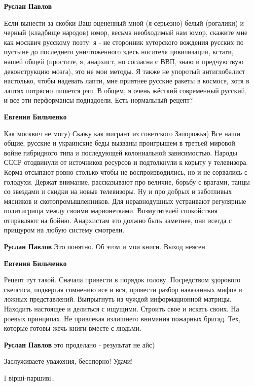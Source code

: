 \begin{itemize}
\begin{itemize} %
\textbf{Руслан Павлов} 

Если вынести за скобки Ваш оцененный мной (я серьезно) белый (рогалики) и
черный (кладбище народов) юмор, весьма необходимый нам юмор, скажите мне как
москвич русскому поэту: я - не сторонник хуторского вождения русских по пустыне
до последнего уничтоженного здесь носителя цивилизации, кстати, нашей общей
(простите, я, анархист, но согласна с ВВП, знаю и предчувствую деконструкцию
мозга), это не мои методы. Я также не упоротый антиглобалист настолько, чтобы
надевать лапти, мне приятнее русские ракеты в космосе, хотя в лаптях потрясно
пишется рэп. В общем, я очень жёсткий современный русский, и все эти
перформансы поднадоели. Есть нормальный рецепт?

\textbf{Евгения Бильченко} 

Как москвич не могу) Скажу как мигрант из советского Запорожья) Все наши общие,
русские и украинские беды вызваны проигрышем в третьей мировой войне гибридного
типа и последующей колониальной зависимостью. Народы СССР отодвинули от
источников ресурсов и подтолкнули к корыту у телевизора. Корма отсыпают ровно
столько чтобы не воспроизводились, но и не сорвались с голодухи. Держат
внимание, рассказывают про величие, борьбу с врагами, танцы со звездами и
скидки на новые телевизоры. Ну и про добрых и заботливых мясников и
скотопромышленников. Для неравнодушных устраивают регулярные политигрища между
своими марионетками. Возмутителей спокойствия отправляют на бойню. Анархистам
это должно быть заметнее, они всегда с прищуром на любую систему смотрели.

\textbf{Руслан Павлов} Это понятно. Об этом и мои книги. Выход неясен

\textbf{Евгения Бильченко} 

Рецепт тут такой. Сначала привести в порядок голову. Посредством здорового
скепсиса, подвергая сомнению все и вся, провести разбор навязанных мифов и
ложных представлений. Выпрыгнуть из чуждой информационной матрицы. Находить
настоящее и делиться с ищущими. Строить свое и искать своих. На роевых
принципах. Не привлекая излишнего внимания пожарных бригад. Тех, которые готовы
жечь книги вместе с людьми.

\textbf{Руслан Павлов} это проделано - результат не айс)
\end{itemize} %

Заслуживаете уважения, бесспорно! Удачи!

І вірші-паршиві..

\end{itemize} %
